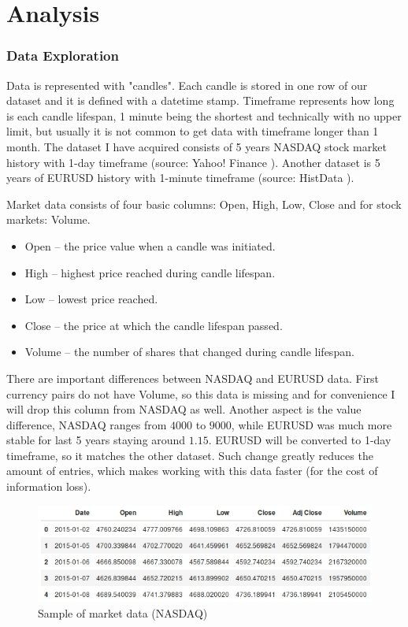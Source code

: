 \documentclass[a4paper,12pt]{article}
\begin{document}

\part{Analysis}
\section{Data Exploration}
Data is represented with "candles". Each candle is stored in one row of our dataset and it is defined with a datetime stamp. Timeframe represents how long is each candle lifespan, 1 minute being the shortest and technically with no upper limit, but usually it is not common to get data with timeframe longer than 1 month.
The dataset I have acquired consists of 5 years NASDAQ stock market history with 1-day timeframe (source: Yahoo! Finance \cite{Yahoo}). Another dataset is 5 years of EURUSD history with 1-minute timeframe (source: HistData \cite{HistData}).

Market data consists of four basic columns: Open, High, Low, Close and for stock markets: Volume.

\begin{itemize}
	\item Open -- the price value when a candle was initiated.
	\item High -- highest price reached during candle lifespan.
	\item Low -- lowest price reached.
	\item Close -- the price at which the candle lifespan passed.
	\item Volume -- the number of shares that changed during candle lifespan.
\end{itemize}

There are important differences between NASDAQ and EURUSD data. First currency pairs do not have Volume, so this data is missing and for convenience I will drop this column from NASDAQ as well. Another aspect is the value difference, NASDAQ ranges from $4000$ to $9000$, while EURUSD was much more stable for last 5 years staying around $1.15$. EURUSD will be converted to 1-day timeframe, so it matches the other dataset. Such change greatly reduces the amount of entries, which makes working with this data faster (for the cost of information loss).

\begin{figure}[h]
	\centering
	\includegraphics[width=\textwidth]{nasdaqTable}
	\caption{Sample of market data (NASDAQ)}
\end{figure}
\end{document}
